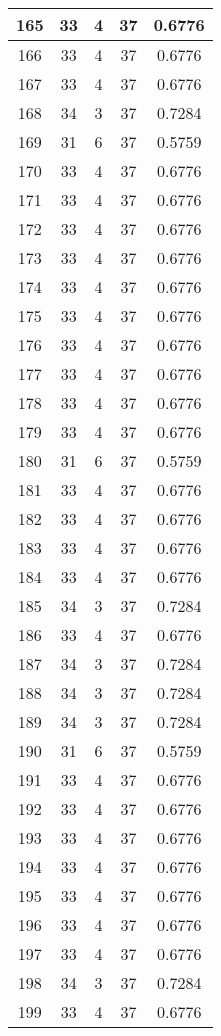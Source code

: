 \documentclass[letterpaper, 12pt]{article}
\begin{document}
\begin{longtable}{|c|c|c|c|c|}
\hline
165 & 33 & 4 & 37 & 0.6776 \\
\hline
166 & 33 & 4 & 37 & 0.6776 \\
\hline
167 & 33 & 4 & 37 & 0.6776 \\
\hline
168 & 34 & 3 & 37 & 0.7284 \\
\hline
169 & 31 & 6 & 37 & 0.5759 \\
\hline
170 & 33 & 4 & 37 & 0.6776 \\
\hline
171 & 33 & 4 & 37 & 0.6776 \\
\hline
172 & 33 & 4 & 37 & 0.6776 \\
\hline
173 & 33 & 4 & 37 & 0.6776 \\
\hline
174 & 33 & 4 & 37 & 0.6776 \\
\hline
175 & 33 & 4 & 37 & 0.6776 \\
\hline
176 & 33 & 4 & 37 & 0.6776 \\
\hline
177 & 33 & 4 & 37 & 0.6776 \\
\hline
178 & 33 & 4 & 37 & 0.6776 \\
\hline
179 & 33 & 4 & 37 & 0.6776 \\
\hline
180 & 31 & 6 & 37 & 0.5759 \\
\hline
181 & 33 & 4 & 37 & 0.6776 \\
\hline
182 & 33 & 4 & 37 & 0.6776 \\
\hline
183 & 33 & 4 & 37 & 0.6776 \\
\hline
184 & 33 & 4 & 37 & 0.6776 \\
\hline
185 & 34 & 3 & 37 & 0.7284 \\
\hline
186 & 33 & 4 & 37 & 0.6776 \\
\hline
187 & 34 & 3 & 37 & 0.7284 \\
\hline
188 & 34 & 3 & 37 & 0.7284 \\
\hline
189 & 34 & 3 & 37 & 0.7284 \\
\hline
190 & 31 & 6 & 37 & 0.5759 \\
\hline
191 & 33 & 4 & 37 & 0.6776 \\
\hline
192 & 33 & 4 & 37 & 0.6776 \\
\hline
193 & 33 & 4 & 37 & 0.6776 \\
\hline
194 & 33 & 4 & 37 & 0.6776 \\
\hline
195 & 33 & 4 & 37 & 0.6776 \\
\hline
196 & 33 & 4 & 37 & 0.6776 \\
\hline
197 & 33 & 4 & 37 & 0.6776 \\
\hline
198 & 34 & 3 & 37 & 0.7284 \\
\hline
199 & 33 & 4 & 37 & 0.6776 \\
\hline
\end{longtable}
\end{document}
